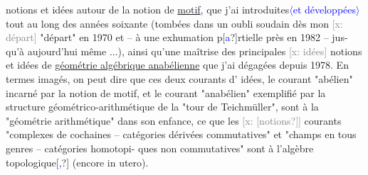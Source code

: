 \documentclass[11pt]{article}
\newcommand{\scanpage}[1]{\par\bigskip\noindent{\small\sffamily[scan #1]}\par}
\newcommand{\mspage}[1]{{\small\sffamily[p.\,#1]}}
\newcommand{\hand}[1]{\textcolor{blue}{#1}}
\newcommand{\inserted}[2][]{\textcolor{blue}{$\langle$#2$\rangle$}}
\newcommand{\xout}[1]{\textcolor{gray}{[\textsf{x:} #1]}}
\newcommand{\uline}[1]{\underline{#1}}
\newcommand{\unsure}[1]{[#1?]}
\begin{document}
\mspage{137}

\clearpage
\scanpage{119/138}
notions et idées autour de la notion de \uline{motif}\hand{,} que j'ai introduites\inserted[typed]{et développées} tout
au long des années soixante (tombées dans un oubli soudain dès mon \xout{départ}
"départ" en 1970 et -- à une exhumation p\unsure{\hand{a}}rtielle près en 1982 -- jus-%
qu'à aujourd'hui même ...), ainsi qu'une maîtrise des principales \xout{idées}
notions et idées de \uline{géométrie algébrique anabélienne} que j'ai dégagées
depuis 1978. En termes imagés, on peut dire que ces deux courants d'
idées, le courant "abélien" incarné par la notion de motif, et le
courant "anabélien" exemplifié par la structure géométrico-arithmétique
de la "tour de Teichmüller", sont à la "géométrie arithmétique" dans son
enfance, ce que les \xout{\unsure{notions}} courants "complexes de cochaines -- catégories
dérivées commutatives" et "champs en tous genres -- catégories homotopi-%
ques non commutatives" sont à l'algèbre topologique\unsure{\hand{,}} (encore in utero).
\end{document}
